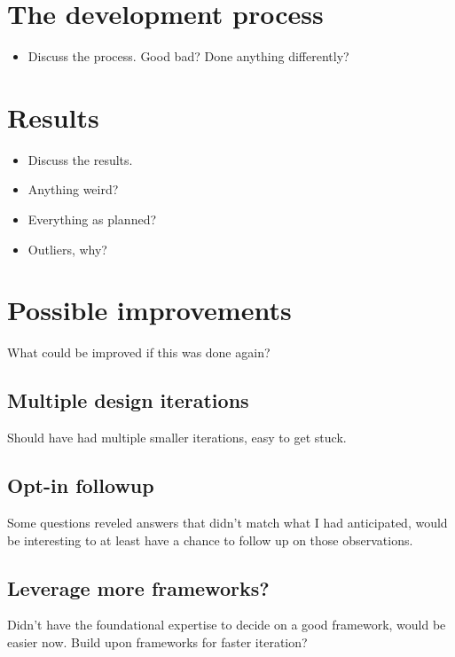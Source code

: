\section{The development process}

  \begin{itemize}
    \item{Discuss the process. Good bad? Done anything differently?}
  \end{itemize}

\section{Results}

  \begin{itemize}
    \item{Discuss the results.}
    \item{Anything weird?}
    \item{Everything as planned?}
    \item{Outliers, why?}
  \end{itemize}

\section{Possible improvements}

  What could be improved if this was done again?

  \subsection{Multiple design iterations}

    Should have had multiple smaller iterations, easy to get stuck.

  \subsection{Opt-in followup}

    Some questions reveled answers that didn't match what I had
    anticipated, would be interesting to at least have a chance to follow
    up on those observations.

  \subsection{Leverage more frameworks?}

    Didn't have the foundational expertise to decide on a good
    framework, would be easier now.
    Build upon frameworks for faster iteration?

